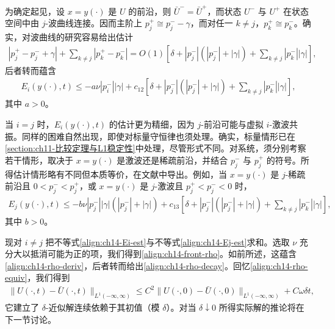 \documentclass[../../main.tex]{subfiles}
\begin{document}
为确定起见，设 $x=y(\cdot)$ 是 $U$ 的前沿，则 $\bar U^-=\bar U^+$，而状态 $U^-$ 与 $U^+$ 在状态空间中由 $j$-波曲线连接。因而主阶上 $p_j^+\cong p_j^--\gamma$，而对任一 $k\neq j$，$p_k^+\cong p_k^-$。确实，对波曲线的研究容易给出估计
\begin{align}
|p_j^+-p_j^-+\gamma|+\sum_{k\neq j}|p_k^+-p_k^-|=O(1)[\delta+|p_j^-|(|p_j^-|+|\gamma|)+\sum_{k\neq j}|p_k^-||\gamma|],
\label{align:ch14-pjump}
\end{align}
后者转而蕴含
\begin{align}
E_i(y(\cdot),t)\leqslant-a\nu|p_i^-||\gamma|+c_{12}[\delta+|p_j^-|(|p_j^-|+|\gamma|)+\sum_{k\neq j}|p_k^-||\gamma|],
\label{align:ch14-Ei-est}
\end{align}
其中 $a>0$。

当 $i=j$ 时，$E_i(y(\cdot),t)$ 的估计更为精细，因为 $j$-前沿可能与虚拟 $i$-激波共振。同样的困难自然出现，即使对标量守恒律也须处理。确实，标量情形已在\cref{section:ch11-比较定理与L1稳定性}中处理，尽管形式不同。对系统，须分别考察若干情形，取决于 $x=y(\cdot)$ 是激波还是稀疏前沿，并结合 $p_j^-$ 与 $p_j^+$ 的符号。所得估计情形略有不同但本质等价，在文献中导出。例如，当 $x=y(\cdot)$ 是 $j$-稀疏前沿且 $0<p_j^-<p_j^+$，或 $x=y(\cdot)$ 是 $j$-激波且 $p_j^+<p_j^-<0$ 时，
\begin{align}
E_j(y(\cdot),t)\leqslant-b\nu|p_j^-||\gamma|(|p_j^-|+|\gamma|)+c_{13}[\delta+|p_j^-|(|p_j^-|+|\gamma|)+\sum_{k\neq j}|p_k^-||\gamma|],
\label{align:ch14-Ej-est}
\end{align}
其中 $b>0$。



现对 $i\neq j$ 把不等式\eqref{align:ch14-Ei-est}与不等式\eqref{align:ch14-Ej-est}求和。选取 $\nu$ 充分大以抵消可能为正的项，我们得到\eqref{align:ch14-front-rho}。如前所述，这蕴含\eqref{align:ch14-rho-deriv}，后者转而给出\eqref{align:ch14-rho-decay}。回忆\eqref{align:ch14-rho-equiv}，我们得到
\begin{align}
\|U(\cdot,t)-\bar U(\cdot,t)\|_{L^1(-\infty,\infty)}\leqslant C^2\|U(\cdot,0)-\bar U(\cdot,0)\|_{L^1(-\infty,\infty)}+C\omega\delta t,
\label{align:ch14-lip}
\end{align}
它建立了 $\delta$-近似解连续依赖于其初值（模 $\delta$）。对当 $\delta\downarrow0$ 所得实际解的推论将在下一节讨论。
\end{document}
